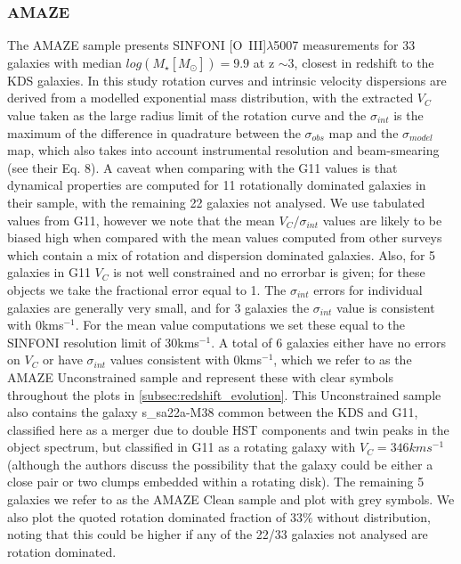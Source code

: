 \documentclass[fleqn,usenatbib]{mn2e}
\begin{document}
\subsubsection{AMAZE}\label{subsubsec:AMAZE}
The AMAZE sample \cite[G11]{Gnerucci2011} presents SINFONI [O~{\sc III}]$\lambda$5007 measurements for 33 galaxies with median $log(M_{\star}[M_{\odot}])=9.9$ at z $\sim 3$, closest in redshift to the KDS galaxies.
In this study rotation curves and intrinsic velocity dispersions are derived from a modelled exponential mass distribution, with the extracted $V_{C}$ value taken as the large radius limit of the rotation curve and the $\sigma_{int}$ is the maximum of the difference in quadrature between the $\sigma_{obs}$ map and the $\sigma_{model}$ map, which also takes into account instrumental resolution and beam-smearing (see their Eq. 8).
A caveat when comparing with the G11 values is that dynamical properties are computed for 11 rotationally dominated galaxies in their sample, with the remaining 22 galaxies not analysed.
We use tabulated values from G11, however we note that the mean $V_{C}/\sigma_{int}$ values are likely to be biased high when compared with the mean values computed from other surveys which contain a mix of rotation and dispersion dominated galaxies.
Also, for 5 galaxies in G11 $V_{C}$ is not well constrained and no errorbar is given; for these objects we take the fractional error equal to 1.
The $\sigma_{int}$ errors for individual galaxies are generally very small, and for 3 galaxies the $\sigma_{int}$ value is consistent with 0kms$^{-1}$.
For the mean value computations we set these equal to the SINFONI resolution limit of 30kms$^{-1}$.
A total of 6 galaxies either have no errors on $V_{C}$ or have $\sigma_{int}$ values consistent with 0kms$^{-1}$, which we refer to as the AMAZE Unconstrained sample and represent these with clear symbols throughout the plots in \cref{subsec:redshift_evolution}.
This Unconstrained sample also contains the galaxy s\_sa22a-M38 common between the KDS and G11, classified here as a merger due to double HST components and twin peaks in the object spectrum, but classified in G11 as a rotating galaxy with $V_{C} = 346kms^{-1}$ (although the authors discuss the possibility that the galaxy could be either a close pair or two clumps embedded within a rotating disk).
The remaining 5 galaxies we refer to as the AMAZE Clean sample and plot with grey symbols.
We also plot the quoted rotation dominated fraction of 33$\%$ without distribution, noting that this could be higher if any of the 22/33 galaxies not analysed are rotation dominated.
\end{document}
